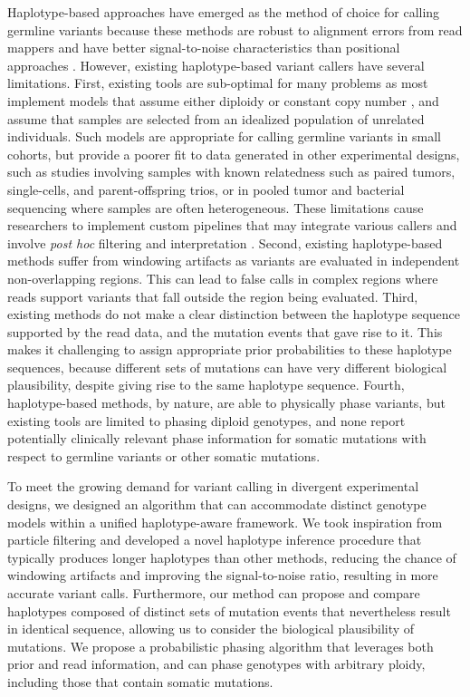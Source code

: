 \documentclass[notitlepage, twocolumn, 10pt]{article}
\begin{document}
\noindent Haplotype-based approaches have emerged as the method of choice for calling germline variants because these methods are robust to alignment errors from read mappers and have better signal-to-noise characteristics than positional approaches \cite{RN5, RN604, RN619, RN141, RN538, RN598, RN166}. However, existing haplotype-based variant callers have several limitations. First, existing tools are sub-optimal for many problems as most implement models that assume either diploidy \cite{RN5, RN604, RN619} or constant copy number \cite{RN141, RN538, RN598}, and assume that samples are selected from an idealized population of unrelated individuals. Such models are appropriate for calling germline variants in small cohorts, but  provide a poorer fit to data generated in other experimental designs, such as studies involving samples with known relatedness such as paired tumors, single-cells, and parent-offspring trios, or in pooled tumor and bacterial sequencing where samples are often heterogeneous. These limitations cause researchers to implement custom pipelines that may integrate various callers and involve \textit{post hoc} filtering and interpretation \cite{RN156, RN361, RN373, RN276, RN3, RN514, RN541, RN572, RN540}. 
Second, existing haplotype-based methods suffer from windowing artifacts as variants are evaluated in independent non-overlapping regions. This can lead to false calls in complex regions where reads support variants that fall outside the region being evaluated. Third, existing methods do not make a clear distinction between the haplotype sequence supported by the read data, and the mutation events that gave rise to it. This makes it challenging to assign appropriate prior probabilities to these haplotype sequences, because different sets of mutations can have very different biological plausibility, despite giving rise to the same haplotype sequence. 
Fourth, haplotype-based methods, by nature, are able to physically phase variants, but existing tools are limited to phasing diploid genotypes, and none report potentially clinically relevant \cite{RN211} phase information for somatic mutations with respect to germline variants or other somatic mutations.

To meet the growing demand for variant calling in divergent experimental designs, we designed an algorithm that can accommodate distinct genotype models within a unified haplotype-aware framework. We took inspiration from particle filtering \cite{Doucet11atutorial} and developed a novel haplotype inference procedure that typically produces longer haplotypes than other methods, reducing the chance of windowing artifacts and improving the signal-to-noise ratio, resulting in more accurate variant calls. Furthermore, our method can propose and compare haplotypes composed of distinct sets of mutation events that nevertheless result in identical sequence, allowing us to consider the biological plausibility of mutations. We propose a probabilistic phasing algorithm that leverages both prior and read information, and can phase genotypes with arbitrary ploidy, including those that contain somatic mutations. 
\end{document}

